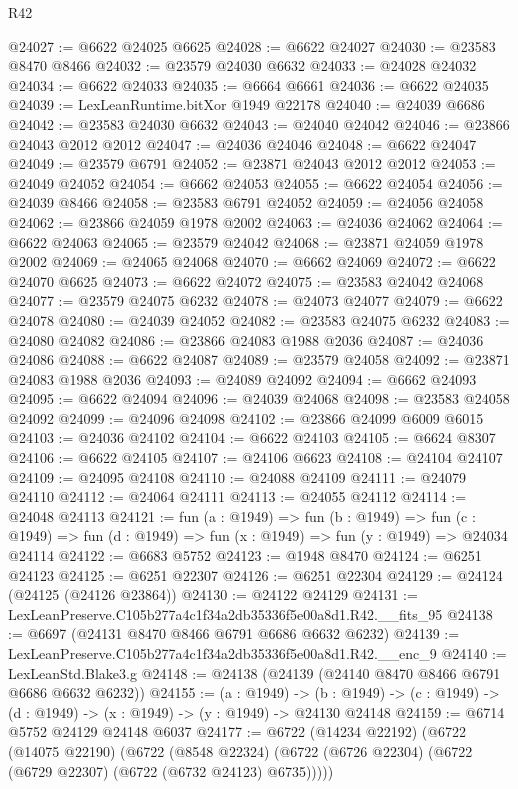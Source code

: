 \begin{lexlean}{R42}
\begin{coremodule}
{@24027 := @6622 @24025 @6625
@24028 := @6622 @24027
@24030 := @23583 @8470 @8466
@24032 := @23579 @24030 @6632
@24033 := @24028 @24032
@24034 := @6622 @24033
@24035 := @6664 @6661
@24036 := @6622 @24035
@24039 := LexLeanRuntime.bitXor @1949 @22178
@24040 := @24039 @6686
@24042 := @23583 @24030 @6632
@24043 := @24040 @24042
@24046 := @23866 @24043 @2012 @2012
@24047 := @24036 @24046
@24048 := @6622 @24047
@24049 := @23579 @6791
@24052 := @23871 @24043 @2012 @2012
@24053 := @24049 @24052
@24054 := @6662 @24053
@24055 := @6622 @24054
@24056 := @24039 @8466
@24058 := @23583 @6791 @24052
@24059 := @24056 @24058
@24062 := @23866 @24059 @1978 @2002
@24063 := @24036 @24062
@24064 := @6622 @24063
@24065 := @23579 @24042
@24068 := @23871 @24059 @1978 @2002
@24069 := @24065 @24068
@24070 := @6662 @24069
@24072 := @6622 @24070 @6625
@24073 := @6622 @24072
@24075 := @23583 @24042 @24068
@24077 := @23579 @24075 @6232
@24078 := @24073 @24077
@24079 := @6622 @24078
@24080 := @24039 @24052
@24082 := @23583 @24075 @6232
@24083 := @24080 @24082
@24086 := @23866 @24083 @1988 @2036
@24087 := @24036 @24086
@24088 := @6622 @24087
@24089 := @23579 @24058
@24092 := @23871 @24083 @1988 @2036
@24093 := @24089 @24092
@24094 := @6662 @24093
@24095 := @6622 @24094
@24096 := @24039 @24068
@24098 := @23583 @24058 @24092
@24099 := @24096 @24098
@24102 := @23866 @24099 @6009 @6015
@24103 := @24036 @24102
@24104 := @6622 @24103
@24105 := @6624 @8307
@24106 := @6622 @24105
@24107 := @24106 @6623
@24108 := @24104 @24107
@24109 := @24095 @24108
@24110 := @24088 @24109
@24111 := @24079 @24110
@24112 := @24064 @24111
@24113 := @24055 @24112
@24114 := @24048 @24113
@24121 := fun (a : @1949) =>
  fun (b : @1949) =>
  fun (c : @1949) => fun (d : @1949) => fun (x : @1949) => fun (y : @1949) => @24034 @24114
@24122 := @6683 @5752
@24123 := @1948 @8470
@24124 := @6251 @24123
@24125 := @6251 @22307
@24126 := @6251 @22304
@24129 := @24124 (@24125 (@24126 @23864))
@24130 := @24122 @24129
@24131 := LexLeanPreserve.C105b277a4c1f34a2db35336f5e00a8d1.R42.__fits_95
@24138 := @6697 (@24131 @8470 @8466 @6791 @6686 @6632 @6232)
@24139 := LexLeanPreserve.C105b277a4c1f34a2db35336f5e00a8d1.R42.__enc_9
@24140 := LexLeanStd.Blake3.g
@24148 := @24138 (@24139 (@24140 @8470 @8466 @6791 @6686 @6632 @6232))
@24155 := (a : @1949) ->
  (b : @1949) -> (c : @1949) -> (d : @1949) -> (x : @1949) -> (y : @1949) -> @24130 @24148
@24159 := @6714 @5752 @24129 @24148 @6037
@24177 := @6722
    (@14234 @22192)
    (@6722
      (@14075 @22190)
      (@6722
        (@8548 @22324)
        (@6722 (@6726 @22304) (@6722 (@6729 @22307) (@6722 (@6732 @24123) @6735)))))
}
\end{coremodule}
\end{lexlean}

